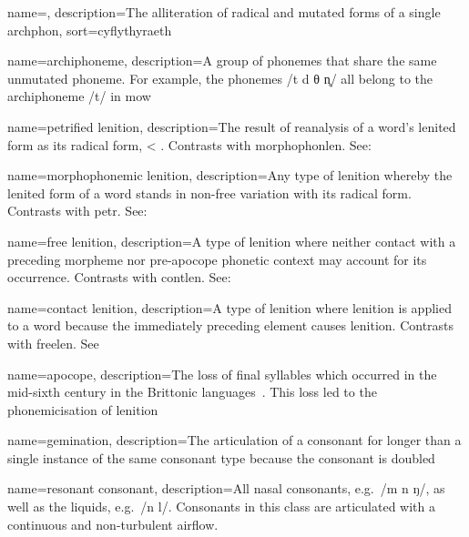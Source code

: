{
    name={},
    description={The alliteration of radical and mutated forms of a single \gls{archphon}},
    sort={cyflythyraeth}
}

{
    name={archi\-phoneme},
    description={A group of phonemes that share the same unmutated phoneme. For example, the phonemes /t d θ n̥/ all belong to the archiphoneme /t/ in \gls{mow}}
}


{
  name={petrified lenition},
  description={The result of reanalysis of a word's lenited form as its radical form, \eg {} < . Contrasts with \gls{morphophonlen}. See: }
}

{
  name={morphophonemic lenition},
  description={Any type of lenition whereby the lenited form of a word stands in non-free variation with its radical form. Contrasts with \gls{petr}. See:~}
}

{
  name={free lenition},
  description={A type of lenition where neither contact with a preceding morpheme nor pre-apocope phonetic context may account for its occurrence. Contrasts with \gls{contlen}. See:~}
}

{
  name={contact lenition},
  description={A type of lenition where lenition is applied to a word because the immediately preceding element causes lenition. Contrasts with \gls{freelen}. See~}
}

{
  name={apocope},
  description={The loss of final syllables which occurred in the mid-sixth century in the Brittonic languages~\autocite[§§~182, 210]{jackson_language_1953}. This loss led to the phonemicisation of lenition}
}

{
  name={gemination},
  description={The articulation of a consonant for longer than a single instance of the same consonant type because the consonant is doubled}
}

{
  name={resonant consonant},
  description={All nasal consonants, e.g.~/m n ŋ/, as well as the liquids, e.g.~/n l/. Consonants in this class are articulated with a continuous and non-turbulent airflow.}
}


